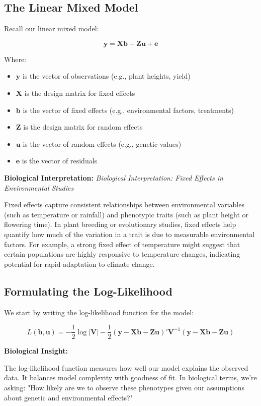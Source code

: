 \documentclass[12pt,a4paper]{article}
\newenvironment{interpretation}[1][]
{\begin{basebox}[linecolor=uqgreen]
\textbf{\color{uqgreen}Biological Interpretation:} \textit{#1}\par\noindent\ignorespaces}
{\end{basebox}}
\newenvironment{biologicalinsightbox}[1][]
{\begin{basebox}[linecolor=uqpurple]
\textbf{\color{uqpurple}Biological Insight:} \textit{#1}\par\noindent\ignorespaces}
{\end{basebox}}
\begin{document}
\subsection{The Linear Mixed Model}

Recall our linear mixed model:

\[
\mathbf{y} = \mathbf{Xb} + \mathbf{Zu} + \mathbf{e}
\]

Where:
\begin{itemize}
    \item $\mathbf{y}$ is the vector of observations (e.g., plant heights, yield)
    \item $\mathbf{X}$ is the design matrix for fixed effects
    \item $\mathbf{b}$ is the vector of fixed effects (e.g., environmental factors, treatments)
    \item $\mathbf{Z}$ is the design matrix for random effects
    \item $\mathbf{u}$ is the vector of random effects (e.g., genetic values)
    \item $\mathbf{e}$ is the vector of residuals
\end{itemize}

\begin{interpretation}[Biological Interpretation: Fixed Effects in Environmental Studies]
Fixed effects capture consistent relationships between environmental variables (such as temperature or rainfall) and phenotypic traits (such as plant height or flowering time). In plant breeding or evolutionary studies, fixed effects help quantify how much of the variation in a trait is due to measurable environmental factors. For example, a strong fixed effect of temperature might suggest that certain populations are highly responsive to temperature changes, indicating potential for rapid adaptation to climate change.
\end{interpretation}


\subsection{Formulating the Log-Likelihood}

We start by writing the log-likelihood function for the model:

\[
L(\mathbf{b}, \mathbf{u}) = -\frac{1}{2} \log |\mathbf{V}| - \frac{1}{2} (\mathbf{y} - \mathbf{Xb} - \mathbf{Zu})' \mathbf{V}^{-1} (\mathbf{y} - \mathbf{Xb} - \mathbf{Zu})
\]

\begin{biologicalinsightbox}

The log-likelihood function measures how well our model explains the observed data. It balances model complexity with goodness of fit. In biological terms, we're asking: "How likely are we to observe these phenotypes given our assumptions about genetic and environmental effects?"
\end{biologicalinsightbox}
\end{document}
